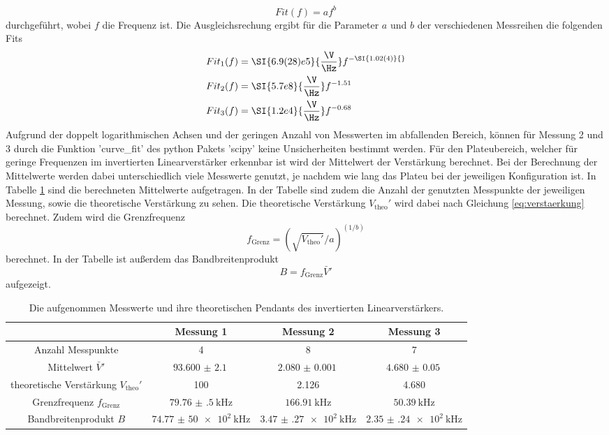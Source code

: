 \begin{equation}
    Fit(f) = a f^b
    \label{eq:fit}
\end{equation}
durchgeführt, wobei $f$ die Frequenz ist.
Die Ausgleichsrechung ergibt für die Parameter $a$ und $b$ der verschiedenen Messreihen die folgenden Fits
\begin{align}
    Fit_1(f) &= \SI{6.9(28)e5}{\frac{\V}{\Hz}} f^{-\SI{1.02(4)}{}} \\
    Fit_2(f) &= \SI{5.7e8}{\frac{\V}{\Hz}} f^{-1.51}\\
    Fit_3(f) &= \SI{1.2e4}{\frac{\V}{\Hz}} f^{-0.68}
\end{align}
Aufgrund der doppelt logarithmischen Achsen und der geringen Anzahl von Messwerten im abfallenden Bereich, können für Messung 2 und 3 durch die Funktion 'curve\_fit' des python Pakets 'scipy' \cite{scipy} keine Unsicherheiten bestimmt werden.
Für den Plateubereich, welcher für geringe Frequenzen im invertierten Linearverstärker erkennbar ist wird der Mittelwert der Verstärkung berechnet.
Bei der Berechnung der Mittelwerte werden dabei unterschiedlich viele Messwerte genutzt, je nachdem wie lang das Plateu bei der jeweiligen Konfiguration ist.
In Tabelle \ref{tab:inv_lin_mittel} sind die berechneten Mittelwerte aufgetragen. 
In der Tabelle sind zudem die Anzahl der genutzten Messpunkte der jeweiligen Messung, sowie die theoretische Verstärkung zu sehen.
Die theoretische Verstärkung $V_\text{theo}'$ wird dabei nach Gleichung \eqref{eq:verstaerkung} berechnet.
Zudem wird die Grenzfrequenz 
\begin{equation*}
  f_\text{Grenz} = \left(\sqrt{V_\text{theo}'}/a\right)^{(1/b)}
\end{equation*}
berechnet.
In der Tabelle ist außerdem das Bandbreitenprodukt
\begin{equation*}
    B = f_\text{Grenz}\bar{V}'
\end{equation*}
aufgezeigt.
\begin{table}
    \hspace*{-2cm}\begin{tabular}{cccc}
        \toprule
         & Messung 1 & Messung 2 & Messung 3\\
        \midrule
        Anzahl Messpunkte & 4 & 8 & 7 \\
        Mittelwert $\bar{V}'$ & $\SI{93.600(2100)}{}$ &  $\SI{2.080(1)}{} $&  $\SI{4.680(50)}{} $ \\
        theoretische Verstärkung $V_\text{theo}'$ & 100 & 2.126 & 4.680 \\
        Grenzfrequenz $f_\text{Grenz}$ & $\SI{79.76(50)}{\kilo\Hz}$ & $\SI{166.91}{\kilo\Hz} $& $\SI{50.39}{\kilo\Hz}$  \\
        Bandbreitenprodukt $B$ & $\SI{74.77(5000)e2}{\kilo\Hz}$ & $\SI{3.47(27)e2}{\kilo\Hz}$ & $\SI{2.35(24)e2}{\kilo\Hz}$ \\
        \bottomrule
    \end{tabular}
    \caption{Die aufgenommen Messwerte und ihre theoretischen Pendants des invertierten Linearverstärkers.}
    \label{tab:inv_lin_mittel}
\end{table} 
